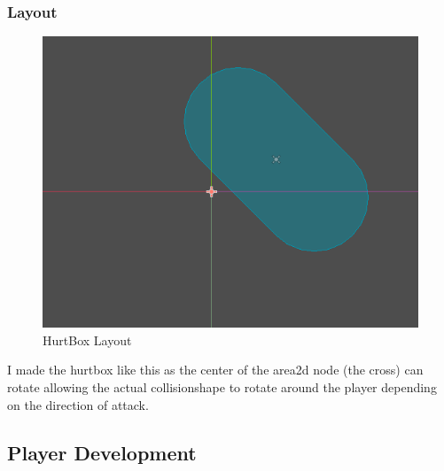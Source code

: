 \documentclass{article}
\begin{document}
        \subsubsection{Layout}
        \begin{figure}[H]
                \centering
                \includegraphics{images/development/HurtBox.PNG}
                \caption{HurtBox Layout}
        \end{figure}
        I made the hurtbox like this as the center of the area2d node (the cross) can rotate allowing the actual collisionshape to rotate around the player depending on the direction of attack.\\
        \subsection{Player Development}
\end{document}
